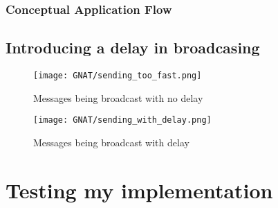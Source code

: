 


\newpage
\subsubsection{Conceptual Application Flow}

\subsection{Introducing a delay in broadcasing}
\newpage
\vfill
\begin{figure}[!h]
  \centering
  \texttt{[image: GNAT/sending\_too\_fast.png]}
  \caption{Messages being broadcast with no delay}
  \label{fig:broadcast_too_fast}
\end{figure}

\begin{figure}[!h]
  \centering
  \texttt{[image: GNAT/sending\_with\_delay.png]}
  \caption{Messages being broadcast with delay}
  \label{fig:broadcast_with_delay}
\end{figure}
\vfill
\newpage

\section{Testing my implementation}
